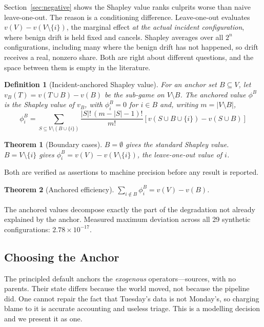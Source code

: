 \documentclass[conference]{IEEEtran}
\newtheorem{theorem}{Theorem}
\newtheorem{definition}{Definition}
\begin{document}
Section~\ref{sec:negative} shows the Shapley value ranks culprits worse than
naive leave-one-out. The reason is a conditioning difference. Leave-one-out
evaluates $v(V)-v(V\setminus\{i\})$, the marginal effect \emph{at the actual
incident configuration}, where benign drift is held fixed and cancels. Shapley
averages over all $2^n$ configurations, including many where the benign drift has
not happened, so drift receives a real, nonzero share. Both are right about
different questions, and the space between them is empty in the literature.

\begin{definition}[Incident-anchored Shapley value]
For an anchor set $B \subseteq V$, let $v_B(T) = v(T \cup B) - v(B)$ be the
sub-game on $V\setminus B$. The anchored value $\phi^B$ is the Shapley value of
$v_B$, with $\phi_i^B = 0$ for $i \in B$ and, writing $m = |V \setminus B|$,
\begin{equation}
\phi_i^B \!=\!\! \sum_{S \subseteq V\setminus(B\cup\{i\})}\!\!\!
  \frac{|S|!\,(m-|S|-1)!}{m!}
  \left[v(S\cup B\cup\{i\}) - v(S\cup B)\right]
\end{equation}
\end{definition}

\begin{theorem}[Boundary cases]
$B=\emptyset$ gives the standard Shapley value. $B = V\setminus\{i\}$ gives
$\phi_i^B = v(V) - v(V\setminus\{i\})$, the leave-one-out value of $i$.
\end{theorem}

Both are verified as assertions to machine precision before any result is
reported.

\begin{theorem}[Anchored efficiency]
$\sum_{i \notin B} \phi_i^B = v(V) - v(B)$.
\end{theorem}

The anchored values decompose exactly the part of the degradation not already
explained by the anchor. Measured maximum deviation across all 29 synthetic
configurations: $2.78\times10^{-17}$.

\subsection{Choosing the Anchor}

The principled default anchors the \emph{exogenous} operators---sources, with no
parents. Their state differs because the world moved, not because the pipeline
did. One cannot repair the fact that Tuesday's data is not Monday's, so charging
blame to it is accurate accounting and useless triage. This is a modelling
decision and we present it as one.
\end{document}
